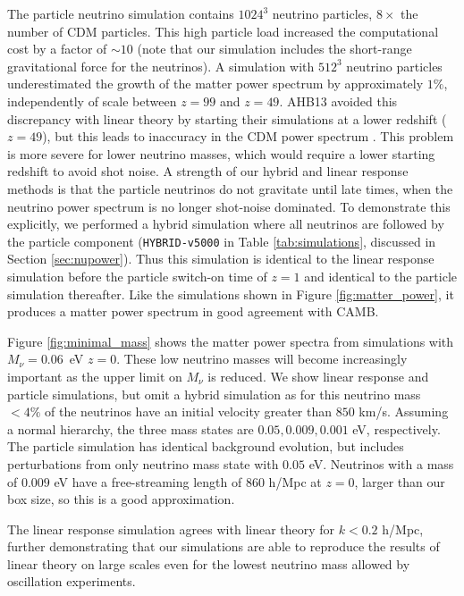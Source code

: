 \documentclass[useAMS, usenatbib]{mnras}
\begin{document}
The particle neutrino simulation contains $1024^3$ neutrino particles, $8\times$ the number of CDM particles. This high particle load increased the computational cost by a factor of $\sim 10$ (note that our simulation includes the short-range gravitational force for the neutrinos). A simulation with $512^3$ neutrino particles underestimated the growth of the matter power spectrum by approximately $1\%$, independently of scale between $z=99$ and $z=49$. AHB13 avoided this discrepancy with linear theory by starting their simulations at a lower redshift ($z=49$), but this leads to inaccuracy in the CDM power spectrum \citep{Heitmann:2010}. This problem is more severe for lower neutrino masses, which would require a lower starting redshift to avoid shot noise. A strength of our hybrid and linear response methods is that the particle neutrinos do not gravitate until late times, when the neutrino power spectrum is no longer shot-noise dominated. To demonstrate this explicitly, we performed a hybrid simulation where all neutrinos are followed by the particle component (\texttt{HYBRID-v5000} in Table \ref{tab:simulations}, discussed in Section \ref{sec:nupower}). Thus this simulation is identical to the linear response simulation before the particle switch-on time of $z=1$ and identical to the particle simulation thereafter. Like the simulations shown in Figure \ref{fig:matter_power}, it produces a matter power spectrum in good agreement with CAMB.

Figure \ref{fig:minimal_mass} shows the matter power spectra from simulations with $M_\nu = 0.06$~eV $z=0$. These low neutrino masses will become increasingly important as the upper limit on $M_\nu$ is reduced. We show linear response and particle simulations, but omit a hybrid simulation as for this neutrino mass $ < 4\%$ of the neutrinos have an initial velocity greater than $850$ km/s. Assuming a normal hierarchy, the three mass states are $0.05, 0.009, 0.001$ eV, respectively. The particle simulation has identical background evolution, but includes perturbations from only neutrino mass state with $0.05$ eV. Neutrinos with a mass of $0.009$ eV have a free-streaming length of $860$ h/Mpc at $z=0$, larger than our box size, so this is a good approximation.

The linear response simulation agrees with linear theory for $k < 0.2$ h/Mpc, further demonstrating that our simulations are able to reproduce the results of linear theory on large scales even for the lowest neutrino mass allowed by oscillation experiments.
\end{document}
